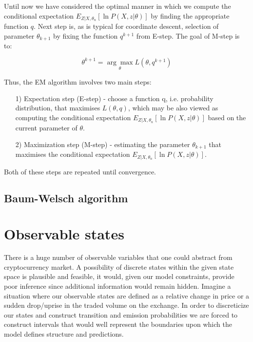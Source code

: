 Until now we have considered the optimal manner in which we compute the conditional expectation $E_{Z|X,\theta_n} [\ln P(X,z|\theta)]$ by finding the appropriate function $q$. Next step is, as is typical for coordinate descent, selection of parameter $\theta_{k+1}$ by fixing the function $q^{k+1}$ from E-step. The goal of M-step is to:

\begin{equation}
\theta^{k+1} = \underset{\theta}{\arg\max} L(\theta, q^{k+1})
\end{equation}

Thus, the EM algorithm involves two main steps:

\begin{itemize}
\item[1)] Expectation step (E-step) - choose a function q, i.e. probability distribution, that maximises $L(\theta, q)$, which may be also viewed as computing the conditional expectation $E_{Z|X,\theta_n} [\ln P(X,z|\theta)]$ based on the current parameter of $\theta$.
\item[2)] Maximization step (M-step) - estimating the parameter $\theta_{k+1}$ that maximises the conditional expectation $E_{Z|X,\theta_n} [\ln P(X,z|\theta)]$.
\end{itemize}

Both of these steps are repeated until convergence. 

\subsection{Baum-Welsch algorithm}






\section{Observable states}

	There is a huge number of observable variables that one could abstract from cryptocurrency market. A possibility of discrete states within the given state space is plausible and feasible, it would, given our model constraints, provide poor inference since additional information would remain hidden. Imagine a situation where our observable states are defined as a relative change in price or a sudden drop/uprise in the traded volume on the exchange. In order to discreticize our states and construct transition and emission probabilities we are forced to construct intervals that would well represent the boundaries upon which the model defines structure and predictions. 
	
